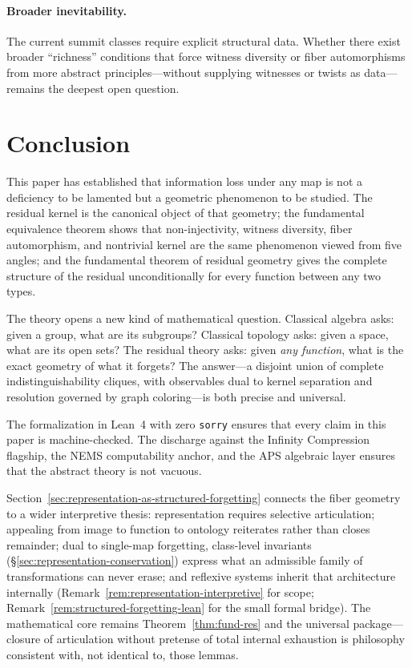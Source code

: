 \documentclass[11pt,a4paper]{article}
\theoremstyle{plain}
\theoremstyle{definition}
\theoremstyle{remark}
\begin{document}
\paragraph{Broader inevitability.}
The current summit classes require explicit structural data. Whether there
exist broader ``richness'' conditions that force witness diversity or fiber
automorphisms from more abstract principles---without supplying witnesses
or twists as data---remains the deepest open question.

\section{Conclusion}\label{sec:conclusion}

This paper has established that information loss under any map is not a
deficiency to be lamented but a geometric phenomenon to be studied. The
residual kernel is the canonical object of that geometry; the fundamental
equivalence theorem shows that non-injectivity, witness diversity, fiber
automorphism, and nontrivial kernel are the same phenomenon viewed from
five angles; and the fundamental theorem of residual geometry gives the
complete structure of the residual unconditionally for every function
between any two types.

The theory opens a new kind of mathematical question. Classical algebra
asks: given a group, what are its subgroups? Classical topology asks: given
a space, what are its open sets? The residual theory asks: given \emph{any
function}, what is the exact geometry of what it forgets? The answer---a
disjoint union of complete indistinguishability cliques, with observables
dual to kernel separation and resolution governed by graph coloring---is
both precise and universal.

The formalization in Lean~4 with zero \texttt{sorry} ensures that every
claim in this paper is machine-checked. The discharge against the Infinity
Compression flagship, the NEMS computability anchor, and the APS algebraic
layer ensures that the abstract theory is not vacuous.

Section~\ref{sec:representation-as-structured-forgetting} connects the fiber
geometry to a wider interpretive thesis: representation requires selective
articulation; appealing from image to function to ontology reiterates rather
than closes remainder; dual to single-map forgetting, class-level invariants
(\S\ref{sec:representation-conservation}) express what an admissible family
of transformations can never erase; and reflexive systems inherit that
architecture internally (Remark~\ref{rem:representation-interpretive} for
scope; Remark~\ref{rem:structured-forgetting-lean} for the small formal
bridge). The mathematical core remains Theorem~\ref{thm:fund-res} and the
universal package---closure of articulation without pretense of total internal
exhaustion is philosophy consistent with, not identical to, those lemmas.
\end{document}
